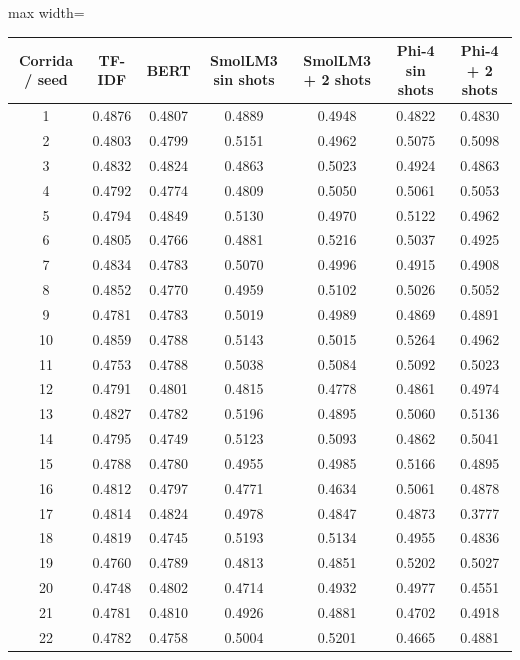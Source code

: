 \documentclass[12pt]{article}
\begin{document}
\begin{table}[H]
  \centering
  \scriptsize
  \begin{adjustbox}{max width=\textwidth}
  \begin{tabular}{ccccccc}
  \toprule
  Corrida / seed & TF-IDF & BERT & SmolLM3 sin shots & SmolLM3 + 2 shots & Phi-4 sin shots & Phi-4 + 2
  shots \\
  \midrule
  1 & 0.4876 & 0.4807 & 0.4889 & 0.4948 & 0.4822 & 0.4830 \\
  2 & 0.4803 & 0.4799 & 0.5151 & 0.4962 & 0.5075 & 0.5098 \\
  3 & 0.4832 & 0.4824 & 0.4863 & 0.5023 & 0.4924 & 0.4863 \\
  4 & 0.4792 & 0.4774 & 0.4809 & 0.5050 & 0.5061 & 0.5053 \\
  5 & 0.4794 & 0.4849 & 0.5130 & 0.4970 & 0.5122 & 0.4962 \\
  6 & 0.4805 & 0.4766 & 0.4881 & 0.5216 & 0.5037 & 0.4925 \\
  7 & 0.4834 & 0.4783 & 0.5070 & 0.4996 & 0.4915 & 0.4908 \\
  8 & 0.4852 & 0.4770 & 0.4959 & 0.5102 & 0.5026 & 0.5052 \\
  9 & 0.4781 & 0.4783 & 0.5019 & 0.4989 & 0.4869 & 0.4891 \\
  10 & 0.4859 & 0.4788 & 0.5143 & 0.5015 & 0.5264 & 0.4962 \\
  11 & 0.4753 & 0.4788 & 0.5038 & 0.5084 & 0.5092 & 0.5023 \\
  12 & 0.4791 & 0.4801 & 0.4815 & 0.4778 & 0.4861 & 0.4974 \\
  13 & 0.4827 & 0.4782 & 0.5196 & 0.4895 & 0.5060 & 0.5136 \\
  14 & 0.4795 & 0.4749 & 0.5123 & 0.5093 & 0.4862 & 0.5041 \\
  15 & 0.4788 & 0.4780 & 0.4955 & 0.4985 & 0.5166 & 0.4895 \\
  16 & 0.4812 & 0.4797 & 0.4771 & 0.4634 & 0.5061 & 0.4878 \\
  17 & 0.4814 & 0.4824 & 0.4978 & 0.4847 & 0.4873 & 0.3777 \\
  18 & 0.4819 & 0.4745 & 0.5193 & 0.5134 & 0.4955 & 0.4836 \\
  19 & 0.4760 & 0.4789 & 0.4813 & 0.4851 & 0.5202 & 0.5027 \\
  20 & 0.4748 & 0.4802 & 0.4714 & 0.4932 & 0.4977 & 0.4551 \\
  21 & 0.4781 & 0.4810 & 0.4926 & 0.4881 & 0.4702 & 0.4918 \\
  22 & 0.4782 & 0.4758 & 0.5004 & 0.5201 & 0.4665 & 0.4881 \\

\end{tabular}
\end{adjustbox}
\end{table}
\end{document}
